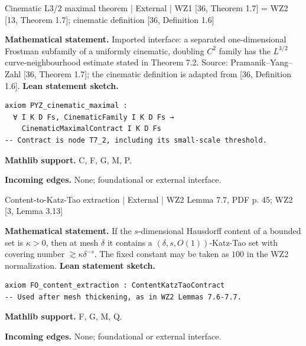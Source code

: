 \documentclass[10pt,a4paper]{article}
\begin{document}
\begin{minipage}{\linewidth}
\hypertarget{node-XPYZ}{}
\begin{tcolorbox}[colback=white,colframe=externalfg,colbacktitle=externalbg,coltitle=ink,boxrule=0.45pt,arc=1.6mm,left=3mm,right=3mm,top=2mm,bottom=2mm,title={\sffamily\bfseries External: Pramanik-Yang-Zahl \hfill \texttt{XPYZ}}]
{\sffamily\small\color{muted}Cinematic L3/2 maximal theorem | External | WZ1 [36, Theorem 1.7] = WZ2 [13, Theorem 1.7]; cinematic definition [36, Definition 1.6]}\par
\textbf{Mathematical statement.} Imported interface: a separated one-dimensional Frostman subfamily of a uniformly cinematic, doubling $C^2$ family has the $L^{3/2}$ curve-neighbourhood estimate stated in Theorem 7.2.
Source: Pramanik--Yang--Zahl [36, Theorem 1.7]; the cinematic definition is adapted from [36, Definition 1.6].
\smallskip\textbf{Lean statement sketch.}
\begin{Verbatim}[fontsize=\small,breaklines=true,breakanywhere=true,tabsize=2]
axiom PYZ_cinematic_maximal :
  ∀ I K D Fs, CinematicFamily I K D Fs →
    CinematicMaximalContract I K D Fs
-- Contract is node T7_2, including its small-scale threshold.
\end{Verbatim}
{\footnotesize\textbf{Mathlib support.} C, F, G, M, P.\par
\textbf{Incoming edges.} None; foundational or external interface.\par}

\end{tcolorbox}\end{minipage}\par\medskip
\begin{minipage}{\linewidth}
\hypertarget{node-XFO}{}
\begin{tcolorbox}[colback=white,colframe=externalfg,colbacktitle=externalbg,coltitle=ink,boxrule=0.45pt,arc=1.6mm,left=3mm,right=3mm,top=2mm,bottom=2mm,title={\sffamily\bfseries External: Fässler-Orponen Lem. 3.13 \hfill \texttt{XFO}}]
{\sffamily\small\color{muted}Content-to-Katz-Tao extraction | External | WZ2 Lemma 7.7, PDF p. 45; WZ2 [3, Lemma 3.13]}\par
\textbf{Mathematical statement.} If the $s$-dimensional Hausdorff content of a bounded set is $\kappa>0$, then at mesh $\delta$ it contains a $(\delta,s,O(1))$-Katz-Tao set with covering number $\gtrsim\kappa\delta^{-s}$.
The fixed constant may be taken as $100$ in the WZ2 normalization.
\smallskip\textbf{Lean statement sketch.}
\begin{Verbatim}[fontsize=\small,breaklines=true,breakanywhere=true,tabsize=2]
axiom FO_content_extraction : ContentKatzTaoContract
-- Used after mesh thickening, as in WZ2 Lemmas 7.6-7.7.
\end{Verbatim}
{\footnotesize\textbf{Mathlib support.} F, G, M, Q.\par
\textbf{Incoming edges.} None; foundational or external interface.\par}

\end{tcolorbox}\end{minipage}\par\medskip
\end{document}

